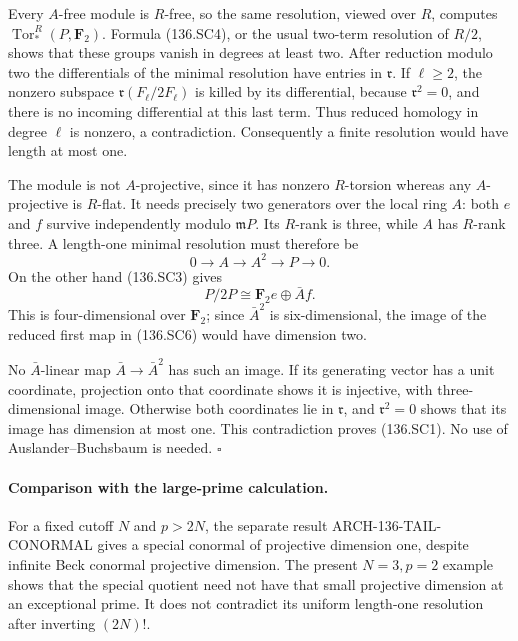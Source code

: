 Every \(A\)-free module is \(R\)-free, so the same resolution,
viewed over \(R\), computes
\(\operatorname{Tor}^R_*(P,\mathbf F_2)\).
Formula (136.SC4), or the usual two-term resolution of \(R/2\),
shows that these groups vanish in degrees at least two.
After reduction modulo two the differentials of the minimal
resolution have entries in \(\mathfrak r\). If \(\ell\geq2\),
the nonzero subspace \(\mathfrak r(F_\ell/2F_\ell)\) is killed
by its differential, because \(\mathfrak r^2=0\), and there
is no incoming differential at this last term. Thus reduced
homology in degree \(\ell\) is nonzero, a contradiction.
Consequently a finite resolution would have length at most one.

The module is not \(A\)-projective, since it has nonzero
\(R\)-torsion whereas any \(A\)-projective is \(R\)-flat.
It needs precisely two generators over the local ring \(A\):
both \(e\) and \(f\) survive independently modulo
\(\mathfrak mP\). Its \(R\)-rank is three, while \(A\) has
\(R\)-rank three. A length-one minimal resolution must therefore
be
\[
                 0\longrightarrow A
                   \longrightarrow A^2\longrightarrow P
                   \longrightarrow0.
                 \tag{136.SC6}
\]
On the other hand (136.SC3) gives
\[
                     P/2P\cong\mathbf F_2 e\oplus\bar A f.
                     \tag{136.SC7}
\]
This is four-dimensional over \(\mathbf F_2\); since
\(\bar A^2\) is six-dimensional, the image of the reduced
first map in (136.SC6) would have dimension two.

No \(\bar A\)-linear map \(\bar A\to\bar A^2\) has such an image.
If its generating vector has a unit coordinate, projection onto
that coordinate shows it is injective, with three-dimensional
image. Otherwise both coordinates lie in \(\mathfrak r\), and
\(\mathfrak r^2=0\) shows that its image has dimension at most one.
This contradiction proves (136.SC1). No use of
Auslander--Buchsbaum is needed.
\hfill\(\square\)

\paragraph{Comparison with the large-prime calculation.}
For a fixed cutoff \(N\) and \(p>2N\), the separate result
ARCH-136-TAIL-CONORMAL gives a special conormal of projective
dimension one, despite infinite Beck conormal projective
dimension. The present \(N=3,p=2\) example shows that the special
quotient need not have that small projective dimension at an
exceptional prime. It does not contradict its uniform
length-one resolution after inverting \((2N)!\).

